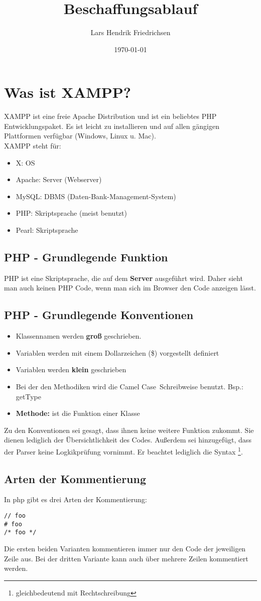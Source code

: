 \documentclass[a4paper,11pt]{scrartcl}	%
\title{Beschaffungsablauf}
\author{Lars Hendrik Friedrichsen}
\date{\today}
\begin{document}
\lstset{language=PHP}

\section{Was ist XAMPP?}
XAMPP ist eine freie Apache Distribution und ist ein beliebtes PHP Entwicklungspaket. Es ist leicht zu installieren und
auf allen gängigen Plattformen verfügbar (Windows, Linux u. Mac). \\[0.5cm]
XAMPP steht für:

\begin{itemize}
	\item X: OS
	\item Apache: Server (Webserver)
	\item MySQL: DBMS (Daten-Bank-Management-System)
	\item PHP: Skriptsprache (meist benutzt)
	\item Pearl: Skriptsprache
\end{itemize}

	\subsection{PHP - Grundlegende Funktion}
	PHP ist eine Skriptsprache, die auf dem \textbf{Server} ausgeführt wird. Daher sieht man auch keinen PHP Code, wenn man
	sich im Browser den Code anzeigen lässt. 
	
	\subsection{PHP - Grundlegende Konventionen}
	
	\begin{itemize}
		\item Klassennamen werden \textbf{groß} geschrieben.
		\item Variablen werden mit einem Dollarzeichen (\$) vorgestellt definiert
		\item Variablen werden \textbf{klein} geschrieben
		\item Bei der den Methodiken wird die \glqq Camel Case\grqq \ Schreibweise benutzt. Bsp.: getType
		\item \textbf{Methode:} ist die Funktion einer Klasse
	\end{itemize}
	
	Zu den Konventionen sei gesagt, dass ihnen keine weitere Funktion zukommt. Sie dienen lediglich der Übersichtlichkeit des Codes.
	Außerdem sei hinzugefügt, dass der Parser keine Logkikprüfung vornimmt. Er beachtet lediglich die Syntax
	\footnote{gleichbedeutend mit Rechtschreibung}.
	
	\subsection{Arten der Kommentierung}
	In php gibt es drei Arten der Kommentierung: 
		\begin{lstlisting}[frame=single]	
// foo
# foo
/* foo */
		\end{lstlisting}
	Die ersten beiden Varianten kommentieren immer nur den Code der jeweiligen Zeile aus. Bei der dritten Variante
	kann auch über mehrere Zeilen kommentiert werden.
	
		
\end{document}

